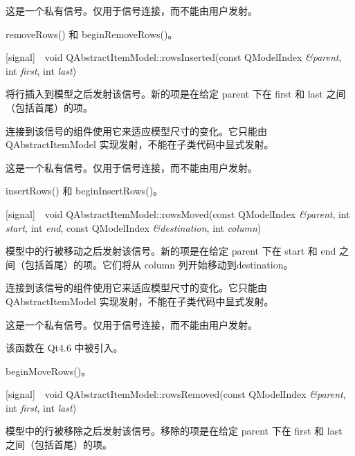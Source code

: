 \begin{notice}
这是一个私有信号。仅用于信号连接，而不能由用户发射。
\end{notice}

\begin{seeAlso}
removeRows() 和 beginRemoveRows()。
\end{seeAlso}

[signal] void QAbstractItemModel::rowsInserted(const QModelIndex \emph{\&parent}, int \emph{first}, int \emph{last})

将行插入到模型之后发射该信号。新的项是在给定 parent 下在 first 和 last 之间（包括首尾）的项。

\begin{notice}
连接到该信号的组件使用它来适应模型尺寸的变化。它只能由 QAbstractItemModel 实现发射，不能在子类代码中显式发射。
\end{notice}

\begin{notice}
这是一个私有信号。仅用于信号连接，而不能由用户发射。
\end{notice}

\begin{seeAlso}
insertRows() 和 beginInsertRows()。
\end{seeAlso}

[signal] void QAbstractItemModel::rowsMoved(const QModelIndex \emph{\&parent}, int \emph{start}, int \emph{end}, const QModelIndex \emph{\&destination}, int \emph{column})

模型中的行被移动之后发射该信号。新的项是在给定 parent 下在 start 和 end 之间（包括首尾）的项。它们将从 column 列开始移动到destination。

\begin{notice}
连接到该信号的组件使用它来适应模型尺寸的变化。它只能由 QAbstractItemModel 实现发射，不能在子类代码中显式发射。
\end{notice}

\begin{notice}
这是一个私有信号。仅用于信号连接，而不能由用户发射。
\end{notice}

该函数在 Qt4.6 中被引入。

\begin{seeAlso}
beginMoveRows()。
\end{seeAlso}

[signal] void QAbstractItemModel::rowsRemoved(const QModelIndex \emph{\&parent}, int \emph{first}, int \emph{last})

模型中的行被移除之后发射该信号。移除的项是在给定 parent 下在 first 和 last 之间（包括首尾）的项。

